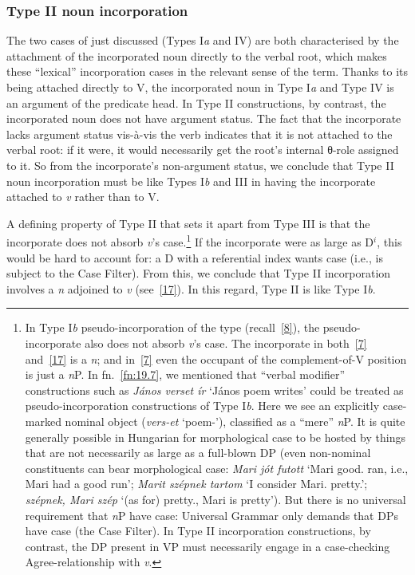\documentclass[output=paper]{langsci/langscibook}
\begin{document}
\begin{refcontext}
\subsubsection{Type II noun incorporation}

The two cases of  just discussed (Types I\emph{a} and IV) are
both characterised by the attachment of the incorporated noun directly to the
verbal root, which makes these \enquote{lexical} incorporation cases in the
relevant sense of the term. Thanks to its being attached directly to V, the
incorporated noun in Type I\emph{a} and Type IV is an argument of the predicate
head. In Type II constructions, by contrast, the incorporated noun does not
have argument status. The fact that the incorporate lacks argument status
vis-\`a-vis the verb indicates that it is not attached to the verbal root: if
it were, it would necessarily get the root's internal θ{}-role assigned to it.
So from the incorporate's non-argument status, we conclude that Type II noun
incorporation must be like Types I\emph{b} and III in having the incorporate
attached to \emph{v} rather than to V.

A defining property of Type II that sets it apart from Type III is that the incorporate does not
absorb \emph{v}'s case.\footnote{In Type I\emph{b} pseudo-incorporation of the
     type (recall~\eqref{8}), the pseudo-incorporate also does not absorb
\emph{v}'s case. The incorporate in both~\eqref{7} and~\eqref{17} is a \emph{n}; and in~\eqref{7} even the occupant of the complement-of-V position is
just a \emph{n}P. In fn.\ \ref{fn:19.7}, we mentioned that  \enquote{verbal modifier}
constructions such as \emph{János verset ír} \enquote*{János poem writes} could be
treated as pseudo-incorporation constructions of Type I\emph{b}. Here we see an
explicitly case-marked nominal object (\emph{vers-et} \enquote*{poem-\Acc{}}),
classified as a \enquote{mere} \emph{n}P. It is quite generally possible in
Hungarian for morphological case to be hosted by things that are not
necessarily as large as a full-blown DP (even non-nominal constituents can bear
morphological case: \emph{Mari jót futott} \enquote*{Mari good.\Acc{} ran,
i.e., Mari had a good run}; \emph{Marit szépnek tartom} \enquote*{I consider
Mari.\Acc{} pretty.\Dat{}}; \emph{szépnek, Mari szép} \enquote*{(as for)
pretty.\Dat{}, Mari is pretty}). But there is no universal requirement
that \emph{n}P have case: Universal Grammar only demands that DPs have case
(the Case Filter). In Type II incorporation constructions, by contrast, the DP
present in VP must necessarily engage in a case-checking
Agree-relationship
with \emph{v}.\label{fn:19.13}} If the incorporate were as large as D$^i$, this would be hard
to account for: a D with a referential index wants case (i.e., is subject to
the Case Filter). From this, we conclude that Type II incorporation involves a
\emph{n} adjoined to \emph{v} (see~\eqref{17}). In this regard, Type II is like
Type I\emph{b}.


\end{refcontext}
\end{document}
